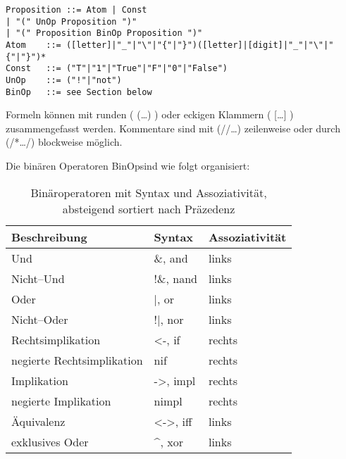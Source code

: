 \documentclass[ngerman,a4paper,abstracton,open=right,twoside=false,toc=listofnumbered,bibtotocnumbered]{scrreprt}
\begin{document}
\begin{verbatim}	
Proposition	::=	Atom | Const
| "(" UnOp Proposition ")"
| "(" Proposition BinOp Proposition ")"
Atom	::=	([letter]|"_"|"\"|"{"|"}")([letter]|[digit]|"_"|"\"|"{"|"}")*
Const	::=	("T"|"1"|"True"|"F"|"0"|"False")
UnOp	::=	("!"|"not")
BinOp	::=	see Section below
\end{verbatim}

Formeln können mit runden ( (\dots) ) oder eckigen Klammern ( [\dots] ) zusammengefasst werden. Kommentare sind mit (//\dots) zeilenweise oder durch (/*\dots */) blockweise möglich.

Die binären Operatoren \glqq BinOp\grqq sind wie folgt organisiert:

\begin{table}[h]
	\begin{tabular}{|l|l|l|}
		\hline
		\textbf{Beschreibung} & \textbf{Syntax} & \textbf{Assoziativität} \\
		\hline
		Und & \&, and & links \\ \hline
		Nicht--Und & !\&, nand & links \\ \hline
		Oder & |, or & links \\ \hline
		Nicht--Oder & !|, nor & links \\ \hline
		Rechtsimplikation & <-, if & rechts \\ \hline
		negierte Rechtsimplikation & nif & rechts \\ \hline
		Implikation & ->, impl & rechts \\ \hline
		negierte Implikation & nimpl & rechts \\ \hline
		Äquivalenz & <->, iff & links \\ \hline
		exklusives Oder & \textasciicircum, xor & links \\ \hline
	\end{tabular}
	\caption{Binäroperatoren mit Syntax und Assoziativität, absteigend sortiert nach Präzedenz}
\end{table}
\end{document}
